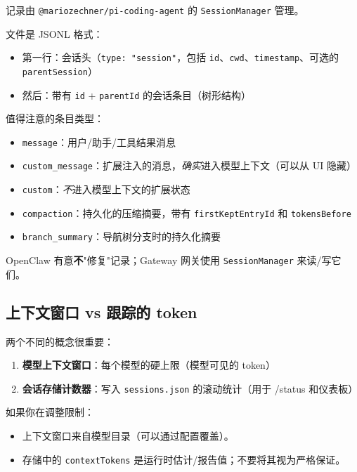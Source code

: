 记录由 \texttt{@mariozechner/pi-coding-agent} 的 \texttt{SessionManager} 管理。

文件是 JSONL 格式：

\begin{itemize}
  \item 第一行：会话头（\texttt{type: "session"}，包括 \texttt{id}、\texttt{cwd}、\texttt{timestamp}、可选的 \texttt{parentSession}）
  \item 然后：带有 \texttt{id} + \texttt{parentId} 的会话条目（树形结构）
\end{itemize}


值得注意的条目类型：

\begin{itemize}
  \item \texttt{message}：用户/助手/工具结果消息
  \item \texttt{custom\_message}：扩展注入的消息，\textit{确实}进入模型上下文（可以从 UI 隐藏）
  \item \texttt{custom}：\textit{不}进入模型上下文的扩展状态
  \item \texttt{compaction}：持久化的压缩摘要，带有 \texttt{firstKeptEntryId} 和 \texttt{tokensBefore}
  \item \texttt{branch\_summary}：导航树分支时的持久化摘要
\end{itemize}


OpenClaw 有意\textbf{不}"修复"记录；Gateway 网关使用 \texttt{SessionManager} 来读/写它们。

\hrulefill


\subsection{上下文窗口 vs 跟踪的 token}


两个不同的概念很重要：

\begin{enumerate}
  \item \textbf{模型上下文窗口}：每个模型的硬上限（模型可见的 token）
  \item \textbf{会话存储计数器}：写入 \texttt{sessions.json} 的滚动统计（用于 /status 和仪表板）
\end{enumerate}


如果你在调整限制：

\begin{itemize}
  \item 上下文窗口来自模型目录（可以通过配置覆盖）。
  \item 存储中的 \texttt{contextTokens} 是运行时估计/报告值；不要将其视为严格保证。
\end{itemize}


